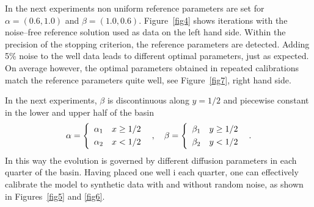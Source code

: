 In the next experiments non uniform reference parameters are set for
$\alpha = (0.6, 1.0)$ and $\beta = (1.0, 0.6)$.
Figure~\ref{fig4} shows iterations with the noise--free reference solution used as data on the left hand side.
Within the precision of the stopping criterion, the reference parameters are detected.
Adding 5\% noise to the well data leads to different optimal parameters, just as expected.
On average however, the optimal parameters obtained in repeated calibrations match the reference parameters quite well,
see Figure~\ref{fig7}, right hand side.

In the next experiments, $\beta$ is discontinuous along $y=1/2$
and piecewise constant in the lower and upper half of the basin
$$
 \alpha = \left\{
 \begin{array}{rl} \alpha_1 & x \ge 1/2 \\[\jot] \alpha_2 & x < 1/2 \end{array}
 \right .
 \enspace , \quad
 \beta = \left\{
 \begin{array}{rl} \beta_1 & y \ge 1/2 \\[\jot] \beta_2 & y < 1/2 \end{array}
 \right .
 \enspace .
$$
In this way the evolution is governed by different diffusion parameters
in each quarter of the basin.
Having placed one well i each quarter,
one can effectively calibrate the model to synthetic data with and without random noise,
as shown in Figures~\ref{fig5} and \ref{fig6}.


